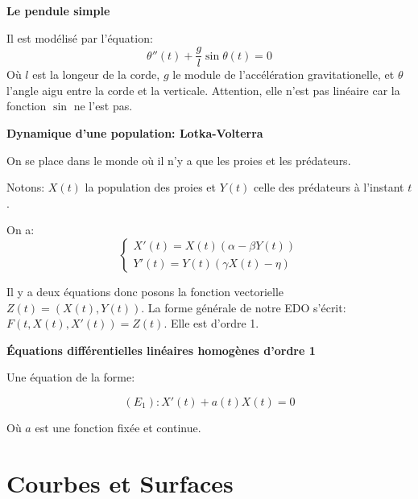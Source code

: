 \documentclass{article}
\begin{document}
\begin{tcolorbox}[colback=cyan!5!white,colframe=cyan!75!black,title=Exemple 1.3]

\textbf{Le pendule simple}

Il est modélisé par l'équation:  
\[
\theta ''(t) + \frac{g}{l} \sin{\theta {(t)}} = 0
\]
Où $l$ est la longeur de la corde, $g$ le module de l'accélération gravitationelle, et $\theta$ l'angle aigu entre la corde et la verticale. Attention, elle n'est pas linéaire car la fonction $\sin$ ne l'est pas.

\end{tcolorbox}

\begin{tcolorbox}[colback=cyan!5!white,colframe=cyan!75!black,title=Exemple 1.4]

\textbf{Dynamique d'une population: Lotka-Volterra}

On se place dans le monde où il n'y a que les proies et les prédateurs.

Notons: $X(t)$ la population des proies et $Y(t)$ celle des prédateurs à l'instant $t$.

On a:
\[
\begin{cases} 
X'(t) = X(t)(\alpha - \beta Y(t))\\
Y'(t) = Y(t)(\gamma X(t) - \eta)
\end{cases}
\]

Il y a deux équations donc posons la fonction vectorielle $Z(t) = (X(t), Y(t))$. La forme générale de notre EDO s'écrit: $F(t, X(t), X'(t)) = Z(t)$. Elle est d'ordre 1.

\end{tcolorbox}



\begin{tcolorbox}[colback=gray!5!white,colframe=gray!75!black,title=Rappel 1.1]

\textbf{Équations différentielles linéaires homogènes d'ordre 1}

Une équation de la forme:

\[
(E_{1}) : X'(t) + a(t)X(t) = 0 
\] 

Où $a$ est une fonction fixée et continue.









\end{tcolorbox}



















\newpage
\part{Courbes et Surfaces}
\end{document}
